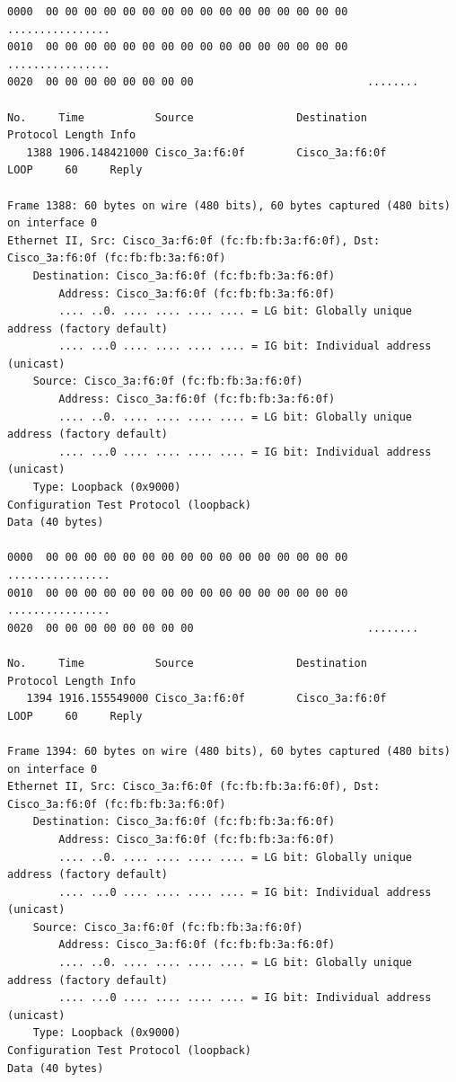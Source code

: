 \documentclass[a4paper,11pt]{article}
\begin{document}
\begin{lstlisting}
0000  00 00 00 00 00 00 00 00 00 00 00 00 00 00 00 00   ................
0010  00 00 00 00 00 00 00 00 00 00 00 00 00 00 00 00   ................
0020  00 00 00 00 00 00 00 00                           ........

No.     Time           Source                Destination           Protocol Length Info
   1388 1906.148421000 Cisco_3a:f6:0f        Cisco_3a:f6:0f        LOOP     60     Reply

Frame 1388: 60 bytes on wire (480 bits), 60 bytes captured (480 bits) on interface 0
Ethernet II, Src: Cisco_3a:f6:0f (fc:fb:fb:3a:f6:0f), Dst: Cisco_3a:f6:0f (fc:fb:fb:3a:f6:0f)
    Destination: Cisco_3a:f6:0f (fc:fb:fb:3a:f6:0f)
        Address: Cisco_3a:f6:0f (fc:fb:fb:3a:f6:0f)
        .... ..0. .... .... .... .... = LG bit: Globally unique address (factory default)
        .... ...0 .... .... .... .... = IG bit: Individual address (unicast)
    Source: Cisco_3a:f6:0f (fc:fb:fb:3a:f6:0f)
        Address: Cisco_3a:f6:0f (fc:fb:fb:3a:f6:0f)
        .... ..0. .... .... .... .... = LG bit: Globally unique address (factory default)
        .... ...0 .... .... .... .... = IG bit: Individual address (unicast)
    Type: Loopback (0x9000)
Configuration Test Protocol (loopback)
Data (40 bytes)

0000  00 00 00 00 00 00 00 00 00 00 00 00 00 00 00 00   ................
0010  00 00 00 00 00 00 00 00 00 00 00 00 00 00 00 00   ................
0020  00 00 00 00 00 00 00 00                           ........

No.     Time           Source                Destination           Protocol Length Info
   1394 1916.155549000 Cisco_3a:f6:0f        Cisco_3a:f6:0f        LOOP     60     Reply

Frame 1394: 60 bytes on wire (480 bits), 60 bytes captured (480 bits) on interface 0
Ethernet II, Src: Cisco_3a:f6:0f (fc:fb:fb:3a:f6:0f), Dst: Cisco_3a:f6:0f (fc:fb:fb:3a:f6:0f)
    Destination: Cisco_3a:f6:0f (fc:fb:fb:3a:f6:0f)
        Address: Cisco_3a:f6:0f (fc:fb:fb:3a:f6:0f)
        .... ..0. .... .... .... .... = LG bit: Globally unique address (factory default)
        .... ...0 .... .... .... .... = IG bit: Individual address (unicast)
    Source: Cisco_3a:f6:0f (fc:fb:fb:3a:f6:0f)
        Address: Cisco_3a:f6:0f (fc:fb:fb:3a:f6:0f)
        .... ..0. .... .... .... .... = LG bit: Globally unique address (factory default)
        .... ...0 .... .... .... .... = IG bit: Individual address (unicast)
    Type: Loopback (0x9000)
Configuration Test Protocol (loopback)
Data (40 bytes)


\end{lstlisting}
\end{document}
